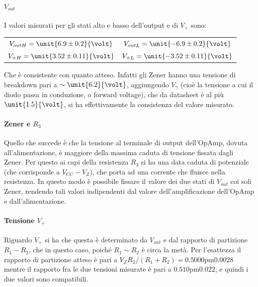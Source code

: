 \documentclass[10pt,a4paper]{article}
\begin{document}
\paragraph{$V_{out}$} I valori misurati per gli stati alto e basso dell'output e di $V_+$ sono:

\begin{table}[H]
	\centering
	\begin{tabular}{cc}
        $ V_{out H} = \unit{6.9 \pm 0.2}{\volt}$  & $V_{out L} = \unit{-6.9 \pm 0.2}{\volt}$\\
        $ V_{+ H} = \unit{3.52 \pm 0.11}{\volt}$  & $V_{+ L} = \unit{-3.52 \pm 0.11}{\volt}$
	\end{tabular}
\end{table}

Che è consistente con quanto atteso. Infatti gli Zener hanno una tensione di breakdown pari a $\sim \unit{6.2}{\volt}$, aggiungendo $V_\gamma$ (cioè la tensione a cui il diodo passa in conduzione, o forward voltage), che da datasheet è al più $\unit{1.5}{\volt}$, si ha effettivamente la consistenza del valore misurato.

\paragraph{Zener e $R_3$} Quello che succede è che la tensione al terminale di output dell'OpAmp, dovuta all'alimentazione, è maggiore della massima caduta di tensione fissata dagli Zener. Per questo ai capi della resistenza $R_3$ si ha una data caduta di potenziale (che corrisponde a $V_{CC}-V_Z$), che porta ad una corrente che fluisce nella resistenza. In questo modo è possibile fissare il valore dei due stati di $V_{out}$ coi soli Zener, rendendo tali valori indipendenti dal valore dell'amplificazione dell'OpAmp e dall'alimentazione.

\paragraph{Tensione $V_+$} Riguardo $V_+$ si ha che questa è determinato da $V_{out}$ e dal rapporto di partizione $R_1 - R_2$, che in questo caso, poiché $R_1 \sim R_2$ è circa la metà. Per l'esattezza il rapporto di partizione atteso è pari a $V_Z R_2/(R_1 + R_2) = \unit{0.5000 \pm 0.0028}$ mentre il rapporto fra le due tensioni misurate è pari a $\unit{0.510 \pm 0.022}$, e quindi i due valori sono compatibili.
\end{document}
